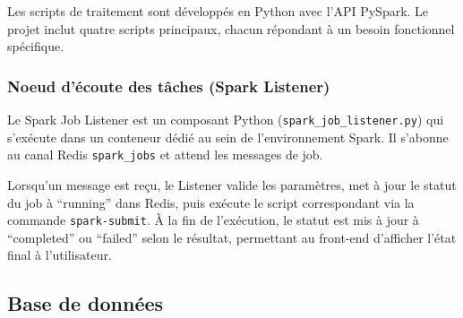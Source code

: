 \documentclass[french]{tai_info} %
\begin{document}
Les scripts de traitement sont développés en Python avec l'API PySpark. Le projet inclut quatre scripts principaux, chacun répondant à un besoin fonctionnel spécifique.

\begin{table}[htbp]
    \centering
    \caption{Scripts PySpark de traitement des données.}
    \label{tab:spark_scripts}
\end{table}

\subsubsection{Noeud d'écoute des tâches (Spark Listener)}

Le Spark Job Listener est un composant Python (\texttt{spark\_job\_listener.py}) qui s'exécute dans un conteneur dédié au sein de l'environnement Spark. Il s'abonne au canal Redis \texttt{spark\_jobs} et attend les messages de job.

Lorsqu'un message est reçu, le Listener valide les paramètres, met à jour le statut du job à ``running'' dans Redis, puis exécute le script correspondant via la commande \texttt{spark-submit}. À la fin de l'exécution, le statut est mis à jour à ``completed'' ou ``failed'' selon le résultat, permettant au front-end d'afficher l'état final à l'utilisateur.

\subsection{Base de données}
\end{document}
